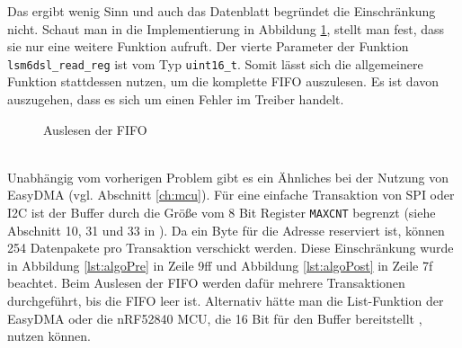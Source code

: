 Das ergibt wenig Sinn und auch das Datenblatt begründet die Einschränkung nicht.
Schaut man in die Implementierung in Abbildung \ref{lst:fifoRead}, stellt man fest, dass sie nur eine weitere Funktion aufruft.
Der vierte Parameter der Funktion \texttt{lsm6dsl\_read\_reg} ist vom Typ \texttt{uint16\_t}.
Somit lässt sich die allgemeinere Funktion stattdessen nutzen, um die komplette FIFO auszulesen.
Es ist davon auszugehen, dass es sich um einen Fehler im Treiber handelt.
\begin{figure}[hbtp]
	
	\caption{Auslesen der FIFO}
	\label{lst:fifoRead}
\end{figure}\\
Unabhängig vom vorherigen Problem gibt es ein Ähnliches bei der Nutzung von EasyDMA (vgl. Abschnitt \ref{ch:mcu}).
Für eine einfache Transaktion von SPI oder I2C ist der Buffer durch die Größe vom 8 Bit Register \texttt{MAXCNT} begrenzt (siehe Abschnitt 10, 31 und 33 in \cite{datasheet_nrf52832}).
Da ein Byte für die Adresse reserviert ist, können 254 Datenpakete pro Transaktion verschickt werden.
Diese Einschränkung wurde in Abbildung \ref{lst:algoPre} in Zeile 9ff und Abbildung \ref{lst:algoPost} in Zeile 7f beachtet.
Beim Auslesen der FIFO werden dafür mehrere Transaktionen durchgeführt, bis die FIFO leer ist.
Alternativ hätte man die List-Funktion der EasyDMA oder die nRF52840 MCU, die 16 Bit für den Buffer bereitstellt \cite{datasheet_nrf52840}, nutzen können.

